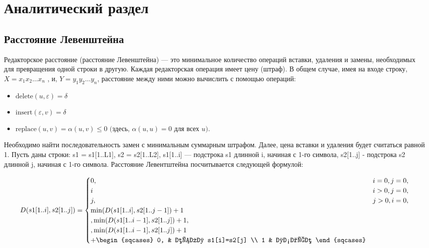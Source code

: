 \chapter{Аналитический раздел}\label{analyth}

\section{Расстояние Левенштейна}\label{defs}

Редакторское расстояние (расстояние Левенштейна) --- это минимальное количество операций вставки, удаления и замены, необходимых для превращения одной строки в другую. Каждая редакторская операция имеет цену (штраф). 
В общем случае, имея на входе строку, $X = x_1x_2 \dots x_n$ , и, $Y = y_1y_2 \dots y_n$, расстояние между ними можно вычислить с помощью операций:
\begin{itemize}
	\item ${\text{delete}(u, \varepsilon) = \delta}$
	\item $\text{insert}(\varepsilon, v) = \delta$
	\item $\text{replace}(u, v) = \alpha(u, v) \leq 0$  $($здесь, $\alpha(u, u) = 0$ для всех $u).$
\end{itemize}

Необходимо найти последовательность замен с минимальным суммарным штрафом. Далее, цена вставки и удаления будет считаться равной 1.
 Пусть даны строки: s1 = s1[1..L1], s2 = s2[1..L2], s1[1..i] --- подстрока s1 длинной i, начиная с 1-го символа, s2[1..j] - подстрока s2 длинной j, начиная с 1-го символа. Расстояние Левентштейна посчитывается следующей формулой:
 
\begin{equation}\label{form:lev}
	D(s1[1..i], s2[1..j]) =
	\begin{cases}
		0,       & i = 0, j =0,\\
		i  & i > 0, j =0, \\
		j, & j > 0, i = 0, \\
		\min(D(s1[1..i], s2[1..j-1]) + 1\\, 
		\min(D(s1[1..i-1], s2[1..j]) + 1, \\,
		\min(D(s1[1..i-1], s2[1..j]) + 1 \\ + 
		\begin{sqcases}
			0, & если s1[i]=s2[j] \\
			1 & иначе
		\end{sqcases}
	\end{cases}
\end{equation}


